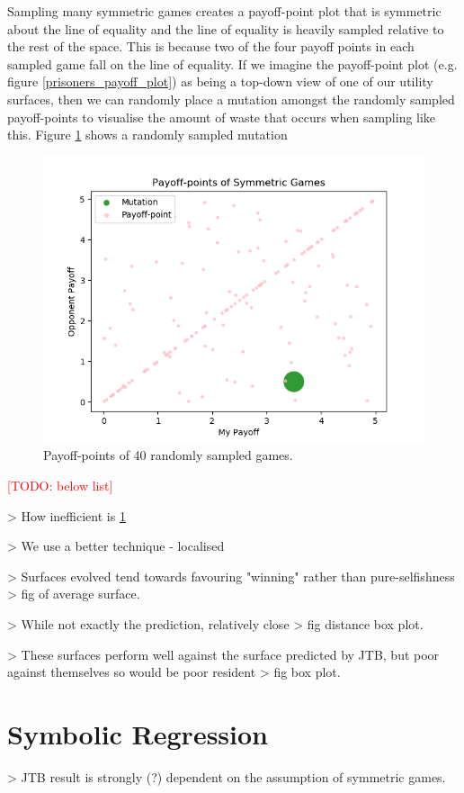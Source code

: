 \documentclass[11pt]{book}
\newcommand{\todo}[1]{\textcolor{red}{[TODO: #1]}\PackageWarning{TODO:}{#1!}}
\newcommand*{\np}{\par\noindent\newline}
\begin{document}
\np Sampling many symmetric games creates a payoff-point plot that is symmetric about the line of equality and the line of equality is heavily sampled relative to the rest of the space.
This is because two of the four payoff points in each sampled game fall on the line of equality.
If we imagine the payoff-point plot (e.g. figure \ref{prisoners_payoff_plot}) as being a top-down view of one of our utility surfaces,
then we can randomly place a mutation amongst the randomly sampled payoff-points to visualise the amount of waste that occurs when sampling like this.
Figure \ref{symmetric_payoff_plot} shows a randomly sampled mutation 
\begin{figure}
	\centering
	\includegraphics[scale=0.7]{resources/scatter_symmetric_mutation.png}
	\caption{Payoff-points of 40 randomly sampled games.}
	\label{symmetric_payoff_plot}
\end{figure}


\todo{below list}
\np > How inefficient is \ref{symmetric_payoff_plot}
\np > We use a better technique - localised
\np > Surfaces evolved tend towards favouring "winning" rather than pure-selfishness > fig of average surface.
\np > While not exactly the prediction, relatively close > fig distance box plot.
\np > These surfaces perform well against the surface predicted by JTB, but poor against themselves so would be poor resident > fig box plot.

\section{Symbolic Regression}
> JTB result is strongly (?) dependent on the assumption of symmetric games.
\end{document}
